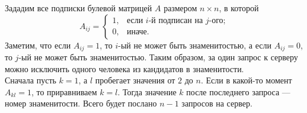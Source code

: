 \documentclass{article}
\begin{document}
Зададим все подписки булевой матрицей $A$ размером $n\times n$, в которой
$$A_{ij} = \begin{cases} 1,&\text{если } i\text{-й подписан на }j\text{-ого;}\\ 0,&\text{иначе.}\end{cases}$$
Заметим, что если $A_{ij} = 1$, то $i$-ый не может быть знаменитостью, а если $A_{ij} = 0$, то $j$-ый не может быть знаменитостью. Таким образом, за 
один запрос к серверу можно исключить одного человека из кандидатов в знаменитости.\\
Сначала пусть $k=1$, а $l$ пробегает значения от $2$ до $n$. Если в какой-то момент $A_{kl}=1$, то приравниваем $k=l$. Тогда значение 
$k$ после последнего запроса --- номер знаменитости. Всего будет послано $n-1$ запросов на сервер.
\end{document}
